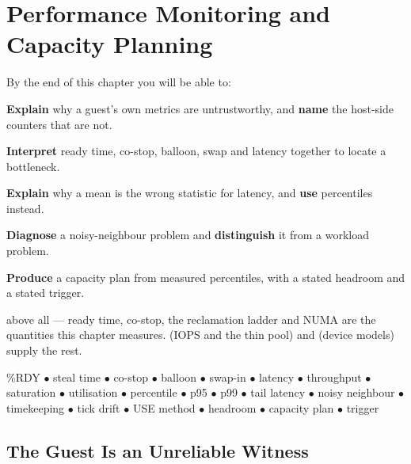 \chapter{Performance Monitoring and Capacity Planning}\label{ch:performance}

\begin{outcomes}
By the end of this chapter you will be able to:
\begin{tight}
  \item \textbf{Explain} why a guest's own metrics are untrustworthy, and
        \textbf{name} the host-side counters that are not.
  \item \textbf{Interpret} ready time, co-stop, balloon, swap and latency
        together to locate a bottleneck.
  \item \textbf{Explain} why a mean is the wrong statistic for latency, and
        \textbf{use} percentiles instead.
  \item \textbf{Diagnose} a noisy-neighbour problem and \textbf{distinguish}
        it from a workload problem.
  \item \textbf{Produce} a capacity plan from measured percentiles, with a
        stated headroom and a stated trigger.
\end{tight}
\end{outcomes}

\begin{prereq}
 above all --- ready time, co-stop, the reclamation ladder and
NUMA are the quantities this chapter measures.  (IOPS and the
thin pool) and  (device models) supply the rest.
\end{prereq}

\begin{keyterms}
\%RDY $\bullet$ steal time $\bullet$ co-stop $\bullet$ balloon $\bullet$
swap-in $\bullet$ latency $\bullet$ throughput $\bullet$ saturation $\bullet$
utilisation $\bullet$ percentile $\bullet$ p95 $\bullet$ p99 $\bullet$ tail
latency $\bullet$ noisy neighbour $\bullet$ timekeeping $\bullet$ tick drift
$\bullet$ USE method $\bullet$ headroom $\bullet$ capacity plan $\bullet$
trigger
\end{keyterms}

\section{The Guest Is an Unreliable Witness}

